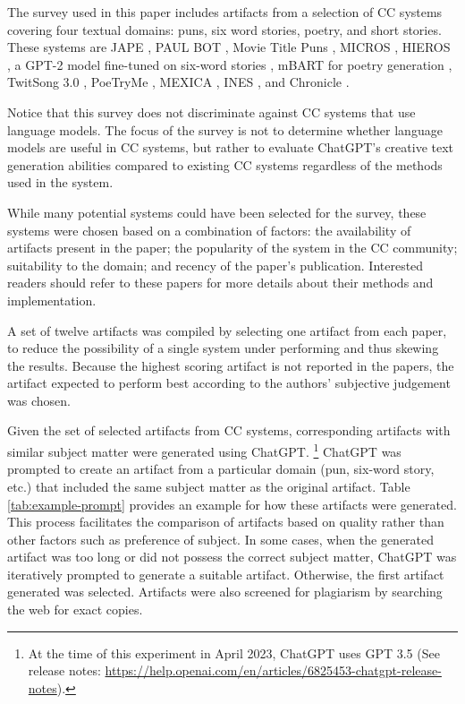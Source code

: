 \documentclass[phd,electronic,oneside,twosidetoc,letterpaper,chaptercenter,parttop,lof]{byumsphd}
\begin{document}
The survey used in this paper includes artifacts from a selection of CC systems covering four textual domains: puns, six word stories, poetry, and short stories. 
These systems are JAPE \cite{ritchie2003jape}, PAUL BOT \cite{tyler2020puns}, Movie Title Puns \cite{hamalainen2019movie}, MICROS \cite{spendlove2018micros}, HIEROS \cite{spendlove2020hieros}, a GPT-2 model fine-tuned on six-word stories \cite{chiengenerating}, mBART for poetry generation \cite{boggia2022poetry}, TwitSong 3.0 \cite{lamb2019poetry}, PoeTryMe \cite{oliveira2016poetryme}, MEXICA \cite{perez2001mexica}, INES \cite{concepcion2019ines}, and Chronicle \cite{Pickering2017}.

Notice that this survey does not discriminate against CC systems that use language models.
The focus of the survey is not to determine whether language models are useful in CC systems, but rather to evaluate ChatGPT's creative text generation abilities compared to existing CC systems regardless of the methods used in the system.

While many potential systems could have been selected for the survey, these systems were chosen based on a combination of factors: the availability of artifacts present in the paper; the popularity of the system in the CC community; suitability to the domain; and recency of the paper's publication.
Interested readers should refer to these papers for more details about their methods and implementation.

A set of twelve artifacts was compiled by selecting one artifact from each paper, to reduce the possibility of a single system under performing and thus skewing the results.
Because the highest scoring artifact is not reported in the papers, the artifact expected to perform best according to the authors' subjective judgement was chosen.

Given the set of selected artifacts from CC systems, corresponding artifacts with similar subject matter were generated using ChatGPT. \footnote{At the time of this experiment in April 2023, ChatGPT uses GPT 3.5 (See release notes:  \url{https://help.openai.com/en/articles/6825453-chatgpt-release-notes}).} 
ChatGPT was prompted to create an artifact from a particular domain (pun, six-word story, etc.) that included the same subject matter as the original artifact. 
Table \ref{tab:example-prompt} provides an example for how these artifacts were generated. 
This process facilitates the comparison of artifacts based on quality rather than other factors such as preference of subject.
In some cases, when the generated artifact was too long or did not possess the correct subject matter, ChatGPT was iteratively prompted to generate a suitable artifact. 
Otherwise, the first artifact generated was selected.
Artifacts were also screened for plagiarism by searching the web for exact copies.
\end{document}
